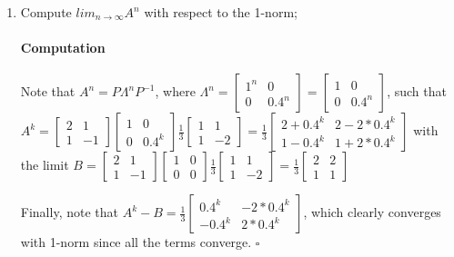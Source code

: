 \documentclass[letterpaper,12pt]{article}
\theoremstyle{definition}
\begin{document}
\begin{enumerate}[label=(\roman*)]
\item Compute $lim_{n \rightarrow\infty}A^n$ with respect to the 1-norm; 

\paragraph{Computation} Note that $A^n = P \Lambda^n P^{-1}$, where $\Lambda^n = \begin{bmatrix}
1^n & 0 \\
0 & 0.4^n
\end{bmatrix}
=\begin{bmatrix}
1 & 0 \\
0 & 0.4^n
\end{bmatrix}$, such that 
$A^k = 
\begin{bmatrix}
2 & 1 \\
1 & -1
\end{bmatrix}
\begin{bmatrix}
1 & 0 \\
0 & 0.4^k
\end{bmatrix}
\frac{1}{3}
\begin{bmatrix}
1 & 1 \\
1 & -2
\end{bmatrix}
=
\frac{1}{3}
\begin{bmatrix}
2 + 0.4^k & 2 - 2*0.4^k \\
1 - 0.4^k & 1 + 2*0.4^k
\end{bmatrix}$
with the limit
$B = 
\begin{bmatrix}
2 & 1 \\
1 & -1
\end{bmatrix}
\begin{bmatrix}
1 & 0 \\
0 & 0
\end{bmatrix}
\frac{1}{3}
\begin{bmatrix}
1 & 1 \\
1 & -2
\end{bmatrix}
= 
\frac{1}{3}
\begin{bmatrix}
2 & 2 \\
1 & 1
\end{bmatrix}
$

Finally, note that $A^k - B =
\frac{1}{3}
\begin{bmatrix}
0.4^k & - 2*0.4^k \\
- 0.4^k & 2*0.4^k
\end{bmatrix}$, which clearly converges with 1-norm since all the terms converge. $\square$





\end{enumerate}
\end{document}
